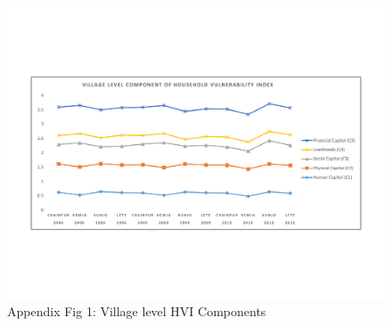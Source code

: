 \documentclass[12pt, a4paper]{article}
\begin{document}
\begin{landscape}
\begin{figure}[h] 
	\vspace{-100pt}
	\includegraphics[scale=0.8]{HVI_Component_Village_Panel.pdf}
	\vspace{-50pt}
	\caption*{Appendix Fig 1: Village level HVI Components} 
	\label{fig:VDClevelhvicomponents}
	\captionsetup{skip=20pt}
\end{figure}
\end{landscape}
\end{document}
